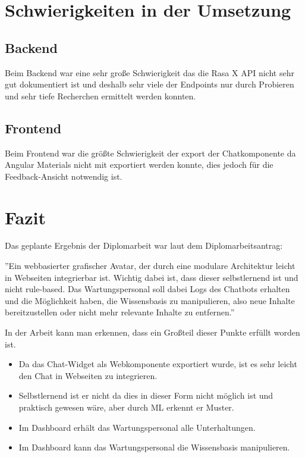 \section{Schwierigkeiten in der Umsetzung}

\subsection{Backend}
Beim Backend war eine sehr große Schwierigkeit das die Rasa X API nicht sehr gut dokumentiert ist und deshalb sehr viele der Endpoints nur durch Probieren und sehr tiefe Recherchen ermittelt werden konnten.


\subsection{Frontend}
Beim Frontend war die größte Schwierigkeit der export der Chatkomponente da Angular Materials nicht mit exportiert werden konnte, dies jedoch für die Feedback-Ansicht notwendig ist.

\section{Fazit}
Das geplante Ergebnis der Diplomarbeit war laut dem Diplomarbeitsantrag:

''Ein webbasierter grafischer Avatar, der durch eine modulare Architektur leicht in Webseiten integrierbar ist.
Wichtig dabei ist, dass dieser selbstlernend ist und nicht rule-based.
Das Wartungspersonal soll dabei Logs des Chatbots erhalten und die Möglichkeit haben, die Wissensbasis zu manipulieren, also neue Inhalte bereitzustellen oder nicht mehr relevante Inhalte zu entfernen.''

In der Arbeit kann man erkennen, dass ein Großteil dieser Punkte erfüllt worden ist.

\begin{itemize}
    \item Da das Chat-Widget als Webkomponente exportiert wurde, ist es sehr leicht den Chat in Webseiten zu integrieren.
    \item Selbstlernend ist er nicht da dies in dieser Form nicht möglich ist und praktisch gewesen wäre, aber durch ML erkennt er Muster.
    \item Im Dashboard erhält das Wartungspersonal alle Unterhaltungen.
    \item Im Dashboard kann das Wartungspersonal die Wissensbasis manipulieren.
\end{itemize}

